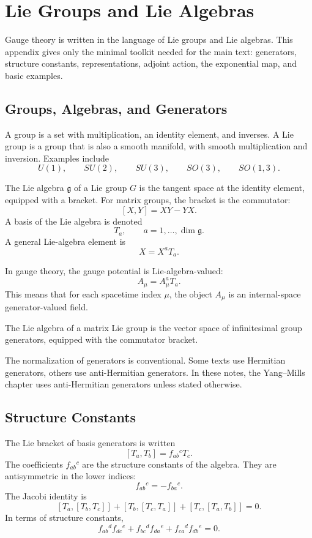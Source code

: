 \chapter{Lie Groups and Lie Algebras}

\begin{remarkbox}
Gauge theory is written in the language of Lie groups and Lie algebras. This
appendix gives only the minimal toolkit needed for the main text: generators,
structure constants, representations, adjoint action, the exponential map, and
basic examples.
\end{remarkbox}

\section{Groups, Algebras, and Generators}

A group is a set with multiplication, an identity element, and inverses. A Lie
group is a group that is also a smooth manifold, with smooth multiplication and
inversion. Examples include
\[
    U(1),\qquad SU(2),\qquad SU(3),\qquad SO(3),\qquad SO(1,3).
\]

The Lie algebra \(\mathfrak{g}\) of a Lie group \(G\) is the tangent space at the
identity element, equipped with a bracket. For matrix groups, the bracket is the
commutator:
\[
    [X,Y]=XY-YX.
\]
A basis of the Lie algebra is denoted
\[
    T_a,\qquad a=1,\ldots,\dim\mathfrak{g}.
\]
A general Lie-algebra element is
\[
    X=X^aT_a.
\]

In gauge theory, the gauge potential is Lie-algebra-valued:
\[
    A_\mu=A_\mu^aT_a.
\]
This means that for each spacetime index \(\mu\), the object \(A_\mu\) is an
internal-space generator-valued field.

\begin{definitionbox}
The Lie algebra of a matrix Lie group is the vector space of infinitesimal group
generators, equipped with the commutator bracket.
\end{definitionbox}

The normalization of generators is conventional. Some texts use Hermitian
generators, others use anti-Hermitian generators. In these notes, the Yang--Mills
chapter uses anti-Hermitian generators unless stated otherwise.

\section{Structure Constants}

The Lie bracket of basis generators is written
\[
    [T_a,T_b]=f_{ab}{}^cT_c.
\]
The coefficients \(f_{ab}{}^c\) are the structure constants of the algebra. They
are antisymmetric in the lower indices:
\[
    f_{ab}{}^c=-f_{ba}{}^c.
\]
The Jacobi identity is
\[
    [T_a,[T_b,T_c]]+[T_b,[T_c,T_a]]+[T_c,[T_a,T_b]]=0.
\]
In terms of structure constants,
\[
    f_{ab}{}^d f_{dc}{}^e
    +f_{bc}{}^d f_{da}{}^e
    +f_{ca}{}^d f_{db}{}^e=0.
\]

